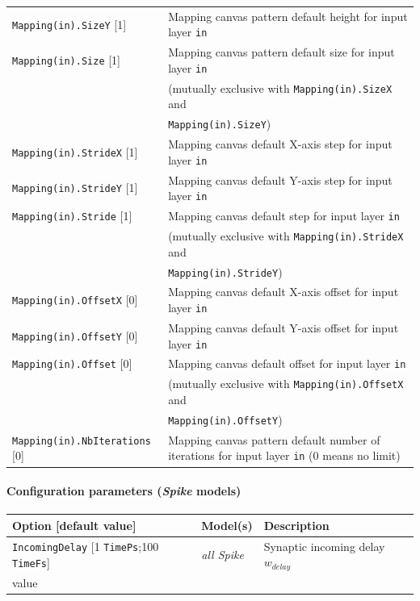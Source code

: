 \documentclass[a4paper,11pt,oneside]{article}
\begin{document}
\begin{center}
\begin{longtable}{| p{5cm} | p{10cm} | }
  \lstinline!Mapping(in).SizeY! [1] & Mapping canvas pattern default height
   for input layer \lstinline!in! \\
  \lstinline!Mapping(in).Size! [1] & Mapping canvas pattern default size
  for input layer \lstinline!in! \\
   & (mutually exclusive with \lstinline!Mapping(in).SizeX! and \\
   & \lstinline!Mapping(in).SizeY!) \\
  \lstinline!Mapping(in).StrideX! [1] & Mapping canvas default X-axis step
   for input layer \lstinline!in! \\
  \lstinline!Mapping(in).StrideY! [1] & Mapping canvas default Y-axis step
  for input layer \lstinline!in! \\
  \lstinline!Mapping(in).Stride! [1] & Mapping canvas default step
  for input layer \lstinline!in! \\
   & (mutually exclusive with \lstinline!Mapping(in).StrideX! and \\
   & \lstinline!Mapping(in).StrideY!) \\
  \lstinline!Mapping(in).OffsetX! [0] & Mapping canvas default X-axis offset
  for input layer \lstinline!in! \\
  \lstinline!Mapping(in).OffsetY! [0] & Mapping canvas default Y-axis offset
  for input layer \lstinline!in! \\
  \lstinline!Mapping(in).Offset! [0] & Mapping canvas default offset for input
   layer \lstinline!in! \\
   & (mutually exclusive with \lstinline!Mapping(in).OffsetX! and \\
   & \lstinline!Mapping(in).OffsetY!) \\
  \lstinline!Mapping(in).NbIterations! [0] & Mapping canvas pattern default
  number of iterations for input layer \lstinline!in! (0 means no limit) \\
 \hline
\end{longtable}
\end{center}

\paragraph{Configuration parameters (\emph{Spike} models)}

\begin{center}
 \begin{longtable}{| p{4cm} | p{3cm} | p{9cm} | }
 \hline
 Option [default value] & Model(s) & Description\\
 \hline\hline
  \lstinline!IncomingDelay! [1 \lstinline!TimePs!;100 \lstinline!TimeFs!]
    & \emph{all Spike} & Synaptic incoming delay $w_{delay}$ \\value \\
 \hline
\end{longtable}
\end{center}
\end{document}
